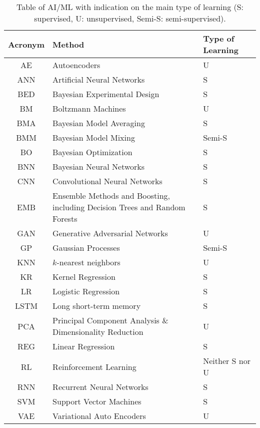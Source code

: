 \documentclass[../../main/main.tex]{subfiles}
\begin{document}
\begin{table*}[!htb]
 \caption{Table of AI/ML with indication on the main type of learning (S: supervised,  U: unsupervised,  Semi-S: semi-supervised).
 }
    \label{tab:acronyms}
\begin{ruledtabular}
    \begin{tabular}{cll} 
    Acronym & Method & Type of Learning \\ \hline 
    AE & Autoencoders & U \\
    ANN     & Artificial Neural Networks & S  \\ 
  BED & Bayesian Experimental Design   & S \\
        BM & Boltzmann Machines & U \\
    BMA & Bayesian Model Averaging & S \\
    BMM & Bayesian Model Mixing & Semi-S \\
    BO & Bayesian Optimization & S \\
    BNN & Bayesian Neural Networks & S \\
    CNN & Convolutional Neural Networks & S \\
     EMB  & Ensemble Methods  and Boosting, including Decision Trees and Random Forests & S \\
    GAN & Generative Adversarial Networks  & U \\
    GP & Gaussian Processes  & Semi-S \\
    KNN & $k$-nearest neighbors & U \\
    KR & Kernel Regression & S \\
    LR & Logistic Regression & S\\ 
    LSTM & Long short-term memory & S\\
    PCA & Principal Component Analysis \& Dimensionality Reduction & U \\
    REG    & Linear Regression  & S \\
    RL & Reinforcement Learning & Neither S nor U \\
    RNN & Recurrent Neural Networks & S \\
    SVM & Support Vector Machines & S \\
    VAE & Variational Auto Encoders & U 
     \end{tabular}
 \end{ruledtabular}  
\end{table*}
\end{document}
